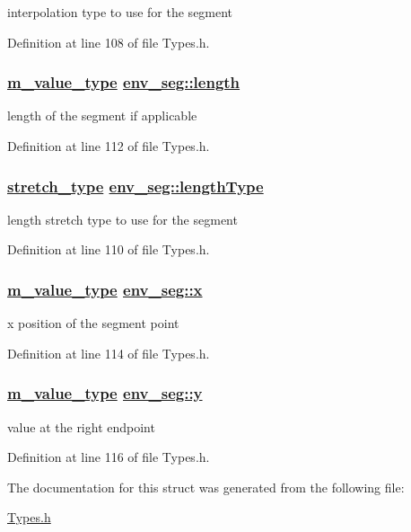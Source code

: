 interpolation type to use for the segment 



Definition at line 108 of file Types.h.\hypertarget{structenv__seg_o2}{
\subsubsection[length]{\setlength{\rightskip}{0pt plus 5cm}\hyperlink{Types_8h_a3}{m\_\-value\_\-type} \hyperlink{structenv__seg_o2}{env\_\-seg::length}}}
\label{structenv__seg_o2}


length of the segment if applicable 



Definition at line 112 of file Types.h.\hypertarget{structenv__seg_o1}{
\subsubsection[lengthType]{\setlength{\rightskip}{0pt plus 5cm}\hyperlink{Types_8h_a12}{stretch\_\-type} \hyperlink{structenv__seg_o1}{env\_\-seg::length\-Type}}}
\label{structenv__seg_o1}


length stretch type to use for the segment 



Definition at line 110 of file Types.h.\hypertarget{structenv__seg_o3}{
\subsubsection[x]{\setlength{\rightskip}{0pt plus 5cm}\hyperlink{Types_8h_a3}{m\_\-value\_\-type} \hyperlink{structenv__seg_o3}{env\_\-seg::x}}}
\label{structenv__seg_o3}


x position of the segment point 



Definition at line 114 of file Types.h.\hypertarget{structenv__seg_o4}{
\subsubsection[y]{\setlength{\rightskip}{0pt plus 5cm}\hyperlink{Types_8h_a3}{m\_\-value\_\-type} \hyperlink{structenv__seg_o4}{env\_\-seg::y}}}
\label{structenv__seg_o4}


value at the right endpoint 



Definition at line 116 of file Types.h.

The documentation for this struct was generated from the following file:\begin{CompactItemize}
\item 
\hyperlink{Types_8h}{Types.h}\end{CompactItemize}
